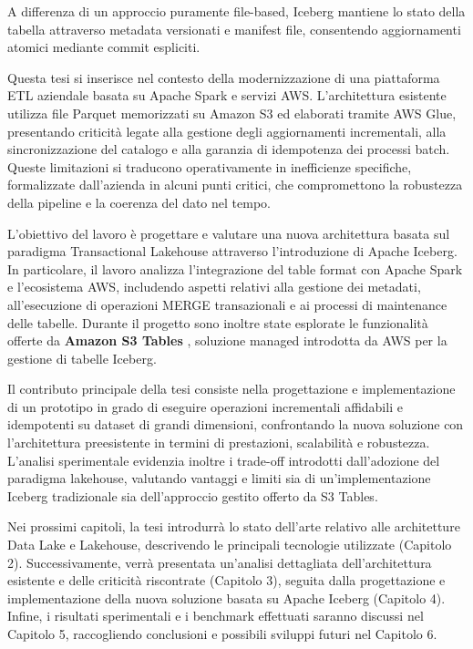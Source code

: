 \documentclass[12pt,a4paper,openright,twoside]{book}
\begin{document}
A differenza di un approccio puramente file-based, Iceberg mantiene lo stato della tabella attraverso metadata versionati e manifest file, consentendo aggiornamenti atomici mediante commit espliciti. \cite{IcebergSpec}

Questa tesi si inserisce nel contesto della modernizzazione di una piattaforma ETL aziendale basata su Apache Spark e servizi AWS.
L'architettura esistente utilizza file Parquet memorizzati su Amazon S3 ed elaborati tramite AWS Glue, presentando criticità legate alla gestione degli aggiornamenti incrementali, alla sincronizzazione del catalogo e alla garanzia di idempotenza dei processi batch.
Queste limitazioni si traducono operativamente in inefficienze specifiche, formalizzate dall'azienda in alcuni punti critici, che compromettono la robustezza della pipeline e la coerenza del dato nel tempo. 

L'obiettivo del lavoro è progettare e valutare una nuova architettura basata sul paradigma Transactional Lakehouse attraverso l'introduzione di Apache Iceberg.
In particolare, il lavoro analizza l'integrazione del table format con Apache Spark e l'ecosistema AWS, includendo aspetti relativi alla gestione dei metadati, all'esecuzione di operazioni MERGE transazionali e ai processi di maintenance delle tabelle.
Durante il progetto sono inoltre state esplorate le funzionalità offerte da \textbf{Amazon S3 Tables} \cite{S3TablesDocs}, soluzione managed introdotta da AWS per la gestione di tabelle Iceberg.

Il contributo principale della tesi consiste nella progettazione e implementazione di un prototipo in grado di eseguire operazioni incrementali affidabili e idempotenti su dataset di grandi dimensioni, confrontando la nuova soluzione con l'architettura preesistente in termini di prestazioni, scalabilità e robustezza.
L'analisi sperimentale evidenzia inoltre i trade-off introdotti dall'adozione del paradigma lakehouse, valutando vantaggi e limiti sia di un'implementazione Iceberg tradizionale sia dell'approccio gestito offerto da S3 Tables.

Nei prossimi capitoli, la tesi introdurrà lo stato dell'arte relativo alle architetture Data Lake e Lakehouse, descrivendo le principali tecnologie utilizzate (Capitolo 2).
Successivamente, verrà presentata un'analisi dettagliata dell'architettura esistente e delle criticità riscontrate (Capitolo 3), 
seguita dalla progettazione e implementazione della nuova soluzione basata su Apache Iceberg (Capitolo 4).
Infine, i risultati sperimentali e i benchmark effettuati saranno discussi nel Capitolo 5, 
raccogliendo conclusioni e possibili sviluppi futuri nel Capitolo 6.
\end{document}
